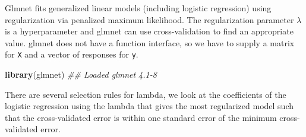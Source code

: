 \documentclass[
  notitlepage]{book}
\newenvironment{Shaded}{\begin{snugshade}}{\end{snugshade}}
\newcommand{\CommentTok}[1]{\textcolor[rgb]{0.56,0.35,0.01}{\textit{#1}}}
\newcommand{\DataTypeTok}[1]{\textcolor[rgb]{0.13,0.29,0.53}{#1}}
\newcommand{\DecValTok}[1]{\textcolor[rgb]{0.00,0.00,0.81}{#1}}
\newcommand{\FloatTok}[1]{\textcolor[rgb]{0.00,0.00,0.81}{#1}}
\newcommand{\KeywordTok}[1]{\textcolor[rgb]{0.13,0.29,0.53}{\textbf{#1}}}
\newcommand{\NormalTok}[1]{#1}
\newcommand{\OperatorTok}[1]{\textcolor[rgb]{0.81,0.36,0.00}{\textbf{#1}}}
\newcommand{\StringTok}[1]{\textcolor[rgb]{0.31,0.60,0.02}{#1}}
\begin{document}
Glmnet fits generalized linear models (including logistic regression)
using regularization via penalized maximum likelihood.
The regularization parameter \(\lambda\) is a hyperparameter and
glmnet can use cross-validation to find an appropriate
value. glmnet does not have a function interface, so we have
to supply a matrix for \texttt{X} and a vector of responses for \texttt{y}.

\begin{Shaded}
\begin{Highlighting}[]
\KeywordTok{library}\NormalTok{(glmnet)}
\CommentTok{\#\# Loaded glmnet 4.1{-}8}
\end{Highlighting}
\end{Shaded}

\begin{Shaded}
\end{Shaded}

There are several selection rules for lambda, we look at the
coefficients of the logistic regression using the
lambda that gives the most regularized model such that the cross-validated error is within one standard error of the minimum cross-validated error.

\begin{Shaded}
\end{Shaded}
\end{document}
